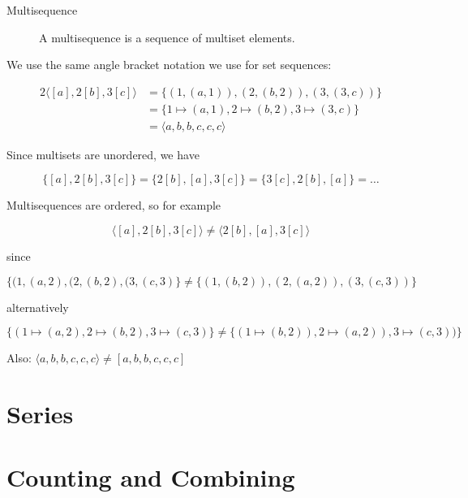 \documentclass[reqno,12pt]{tufte-book}
\numberwithin{equation}{subsection}
\begin{document}
\begin{description}
\item [Multisequence]  A multisequence is a sequence of multiset elements.
\end{description}

We use the same angle bracket notation we use for set sequences:

\begin{alignat}{2}
  \langle [a],2[b],3[c]\rangle &= \{(1, (a,1)), (2,(b,2)), (3,(3,c))\} \\
  &= \{1\mapsto (a,1), 2\mapsto (b,2), 3\mapsto (3,c)\} \\
  &= \langle a,b,b,c,c,c\rangle
\end{alignat}

Since multisets are unordered, we have

\begin{equation}
  \{[a],2[b],3[c]\} = \{2[b],[a],3[c]\} = \{3[c],2[b],[a]\} = \ldots
\end{equation}

Multisequences are ordered, so for example

\begin{equation}
  \langle [a],2[b],3[c]\rangle \neq \langle2[b],[a],3[c]\rangle
\end{equation}

\noindent since

\begin{equation}
  \{(1,(a,2), (2,(b,2), (3,(c,3)\}\neq \{(1,(b,2)), (2,(a,2)), (3,(c,3))\}
\end{equation}

\noindent alternatively

\begin{equation}
  \{(1\mapsto (a,2), 2\mapsto (b,2), 3\mapsto (c,3)\} 
  \neq \{(1\mapsto (b,2)), 2\mapsto (a,2)), 3\mapsto (c,3))\}
\end{equation}

Also:  $\langle a,b,b,c,c,c\rangle \neq [a,b,b,c,c,c]$

\chapter{Series}

\chapter{Counting and Combining}
\end{document}
